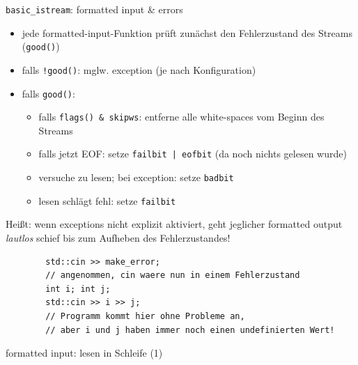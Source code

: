 \begin{frame}[fragile]{\texttt{basic\_istream}: formatted input \& errors}
	\begin{itemize}
		\item jede formatted-input-Funktion prüft zunächst den Fehlerzustand des Streams (\texttt{good()})
		\item falls \texttt{!good()}: mglw. exception (je nach Konfiguration)
		\item falls \texttt{good()}:
			\begin{itemize}
				\item falls \texttt{flags() \& skipws}: entferne alle white-spaces vom Beginn des Streams
				\item falls jetzt EOF: setze \texttt{failbit | eofbit} (da noch nichts gelesen wurde)
				\item versuche zu lesen; bei exception: setze \texttt{badbit}
				\item lesen schlägt fehl: setze \texttt{failbit}
			\end{itemize}
	\end{itemize}
	
	\pause
	
	Heißt: wenn exceptions nicht explizit aktiviert, geht jeglicher formatted output \emph{lautlos} schief bis zum Aufheben des Fehlerzustandes!
	
	\begin{lstlisting}
		std::cin >> make_error;
		// angenommen, cin waere nun in einem Fehlerzustand
		int i; int j;
		std::cin >> i >> j;
		// Programm kommt hier ohne Probleme an,
		// aber i und j haben immer noch einen undefinierten Wert!
	\end{lstlisting}
\end{frame}

\begin{frame}[t]{formatted input: lesen in Schleife (1)}
	\begin{columns}[t]
		\hspace{2em}
			\onslide*<+> {  }
			\onslide<+-> {  }
			
		\column{0.5\textwidth}
			\vspace{2.25em}
			\onslide*<+> {  }
			\onslide<+-> {  }
	\end{columns}
\end{frame}


